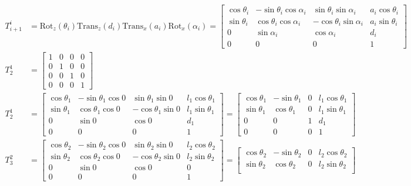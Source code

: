 \documentclass[10pt]{article}
\begin{document}
\begin{itemize}
	\begin{align*}
		T_{i+1}^i &= \text{Rot}_z(\theta_i) \text{Trans}_z(d_i) \text{Trans}_x(a_i) \text{Rot}_x(\alpha_i) = \begin{bmatrix}
		\cos\theta_i & -\sin\theta_i \cos\alpha_i &\sin\theta_i \sin\alpha_i & a_i \cos\theta_i \\
		\sin\theta_i & \cos\theta_i \cos\alpha_i & -\cos\theta_i \sin\alpha_i & a_i \sin\theta_i \\
		0 & \sin\alpha_i & \cos\alpha_i & d_i \\
		0 & 0 & 0 & 1
		\end{bmatrix}
		\\
		T_{2}^1 &= \begin{bmatrix}
		1 & 0 & 0 & 0 \\
		0 & 1 & 0 & 0 \\
		0 & 0 & 1 & 0 \\
		0 & 0 & 0 & 1
		\end{bmatrix}
		\\
		T_{2}^1 &= \begin{bmatrix}
		\cos\theta_1 & -\sin\theta_1 \cos 0 &\sin\theta_1 \sin 0 & l_1 \cos\theta_1 \\
		\sin\theta_1 & \cos\theta_1 \cos 0 & -\cos\theta_1 \sin 0 & l_1 \sin\theta_1 \\
		0 & \sin 0 & \cos 0 & d_1 \\
		0 & 0 & 0 & 1
		\end{bmatrix} = \begin{bmatrix}
		\cos\theta_1 & -\sin\theta_1 & 0 & l_1 \cos\theta_1 \\
		\sin\theta_1 & \cos\theta_1 & 0 & l_1 \sin\theta_1 \\
		0 & 0 & 1 & d_1 \\
		0 & 0 & 0 & 1
		\end{bmatrix}
		\\
		T_{3}^2 &= \begin{bmatrix}
		\cos\theta_2 & -\sin\theta_2 \cos 0 &\sin\theta_2 \sin 0 & l_2 \cos\theta_2 \\
		\sin\theta_2 & \cos\theta_2 \cos 0  & -\cos\theta_2 \sin 0 & l_2 \sin\theta_2 \\
		0 & \sin 0 & \cos 0 & 0 \\
		0 & 0 & 0 & 1
		\end{bmatrix} = \begin{bmatrix}
		\cos\theta_2 & -\sin\theta_2 & 0 & l_2 \cos\theta_2 \\
		\sin\theta_2 & \cos\theta_2 & 0 & l_2 \sin\theta_2 \\

\end{bmatrix}
\end{align*}
\end{itemize}
\end{document}
